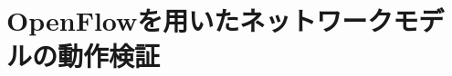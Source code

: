 \chapter{OpenFlowを用いたネットワークモデルの動作検証}

\begin{comment}
　本研究では，シミュレーションによってns-3上でEUNETを構築し，シミュレーションを行うことを目的としている．
シミュレーションは，実際のEUNETをモデル化して構築した上でパケットをキャプチャする事で性能を評価する事ができるようになる．

本章では，EUNETを再現するために作成したモジュールをどのように利用してトポロジを構築し，動作確認を行ったか解説する．\\

\section{各モジュールの動作確認}

本研究では3章で説明したようにns-3上でモジュールをC++で記述する事により作成しており，そのモジュールの組み合わせで意図するネットワークを構築していく．
そのため前提条件として，各モジュールが正常に動作する事が求められる．
そこで，作成したモジュールを用いて単純なネットワークを構成し，そのネットワークでのパケットの振る舞いを検証する事でモジュールが正常に動作しているかを確認した．\\
その際使用したテストシナリオを解説し，その結果を示す．実際に使用したテストシナリオは付録参照．

\subsection{EunetTestにおけるテストシナリオ}

動作確認を行うネットワーク機器は端末，L2スイッチ，L3スイッチの3つである．この機器を用いてネットワークを構成する．
端末はUDPで通信をおこなっており，パケットロスが生じた場合は再送を行わない．

\begin{figure}[tb]
\begin{center}
\scalebox{0.6}{\texttt{[image: testsuit構成図.eps]}} 
\caption{テストシナリオ構成}
\label{テストシナリオ構成}
\end{center}
\end{figure}

テストにおける構成は，図\ref{テストシナリオ構成}に記述している．
L3スイッチは3つ作成する．各L3スイッチはr1，r2，r3という名前を付け全てのL3スイッチは隣接して接続されている．
テストケースではr1，r3は以下に複数のL2スイッチ，端末を持つ．これを二つのエリアとみなし，ルーチングを行うことが可能か確認を行う．


\end{comment}
